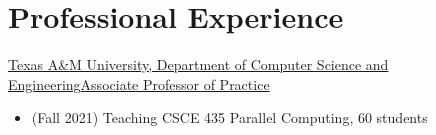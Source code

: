 \section{Professional Experience}

		{\href{https://engineering.tamu.edu/cse/index.html}{Texas A\&M University, Department of Computer Science and Engineering}}{\href{https://engineering.tamu.edu/cse/profiles/pearce-olga.html}{Associate Professor of Practice}}{}{}
		{\begin{itemize}
		  \item (Fall 2021) Teaching CSCE 435 Parallel Computing, 60 students
		\end{itemize}}

